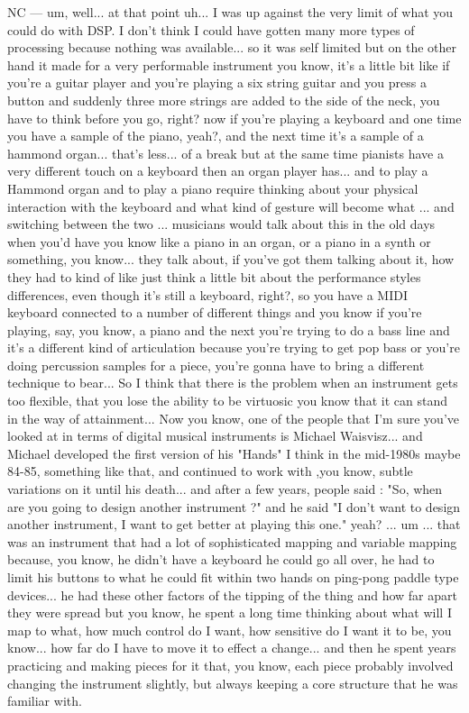 NC — um, well... at that point uh... I was up against the very limit of what you could do with DSP. I don't think I could have gotten many more types of processing because nothing was available... so it was self limited but on the other hand it made for a very performable instrument you know, it's a little bit like if you're a guitar player and you're playing a six string guitar and you press a button and suddenly three more strings are added to the side of the neck, you have to think before you go, right? now if you're playing a keyboard and one time you have a sample of the piano, yeah?, and the next time it's a sample of a hammond organ... that's less... of a break but at the same time pianists have a very different touch on a keyboard then an organ player has... and to play a Hammond organ and to play a piano require thinking about your physical interaction with the keyboard and what kind of gesture will become what ...  and switching between the two ... musicians would talk about this in the old days when you'd have you know like a piano in an organ, or a piano in a synth or something, you know... they talk about, if you've got them talking about it, how they had to kind of like just think a little bit about the performance styles differences, even though it's still a keyboard, right?, so you have a MIDI keyboard connected to a number of different things and you know if you're playing, say, you know, a piano and the next you're trying to do a bass line and it's a different kind of articulation because you're trying to get pop bass or you're doing percussion samples for a piece, you're gonna have to bring a different technique to bear... So I think that there is the problem when an instrument gets too flexible, that you lose the ability to be virtuosic you know that it can stand in the way of attainment... Now you know, one of the people that I'm sure you've looked at in terms of digital musical instruments is Michael Waisvisz... and Michael developed the first version of his "Hands" I think in the mid-1980s maybe 84-85, something like that, and continued to work with ,you know, subtle variations on it until his death... and after a few years, people said : "So, when are you going to design another instrument ?" and he said "I don't want to design another instrument,  I want to get better at playing this one." yeah? ... um ... that was  an instrument that had a lot of sophisticated mapping and variable mapping because, you know, he didn't have a keyboard he could go all over, he had to limit his buttons to what he could fit within two hands on  ping-pong paddle type devices... he had these other factors of the tipping of the thing and how far apart they were spread but you know, he spent a long time thinking about what will I map to what, how much control do I want, how sensitive do I want it to be, you know... how far do I have to move it to effect a change... and then he spent years practicing and making pieces for it that, you know, each piece probably involved changing the instrument slightly, but always keeping a core structure that he was familiar with. 

